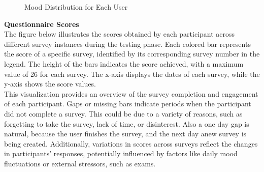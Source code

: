 \FloatBarrier
\begin{figure}[h!]\ContinuedFloat
    \centering
    \hfill
\end{figure}
\FloatBarrier

\FloatBarrier
\begin{figure}[h!]\ContinuedFloat
    \centering
    \caption{Mood Distribution for Each User}
\end{figure}
\FloatBarrier

\vspace{5mm}

\noindent \textbf{Questionnaire Scores} \\
The figure below illustrates the scores obtained by each participant across different survey instances during the testing phase. Each colored bar represents the score of a specific survey, identified by its corresponding survey number in the legend. The height of the bars indicates the score achieved, with a maximum value of 26 for each survey. The x-axis displays the dates of each survey, while the y-axis shows the score values.\vspace{5mm} \\
This visualization provides an overview of the survey completion and engagement of each participant. Gaps or missing bars indicate periods when the participant did not complete a survey. This could be due to a variety of reasons, such as forgetting to take the survey, lack of time, or disinterest. Also a one day gap is natural, because the user finishes the survey, and the next day anew survey is being created. Additionally, variations in scores across surveys reflect the changes in participants' responses, potentially influenced by factors like daily mood fluctuations or external stressors, such as exams.

